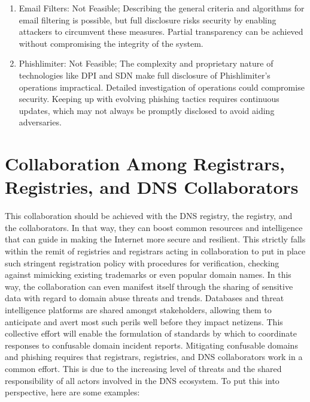 \begin{enumerate}
    \item Email Filters: Not Feasible;  Describing the general criteria and algorithms for email filtering is possible, but full disclosure risks security by enabling attackers to circumvent these measures. Partial transparency can be achieved without compromising the integrity of the system.
    
   
    \item Phishlimiter: Not Feasible; The complexity and proprietary nature of technologies like DPI and SDN make full disclosure of Phishlimiter's operations impractical. Detailed investigation of operations could compromise security. Keeping up with evolving phishing tactics requires continuous updates, which may not always be promptly disclosed to avoid aiding adversaries.
    
\end{enumerate}


\section{Collaboration Among Registrars, Registries, and DNS Collaborators}

This collaboration should be achieved with the DNS registry, the registry, and the collaborators. In that way, they can boost common resources and intelligence that can guide in making the Internet more secure and resilient. This strictly falls within the remit of registries and registrars acting in collaboration to put in place such stringent registration policy with procedures for verification, checking against mimicking existing trademarks or even popular domain names. In this way, the collaboration can even manifest itself through the sharing of sensitive data with regard to domain abuse threats and trends. Databases and threat intelligence platforms are shared amongst stakeholders, allowing them to anticipate and avert most such perils well before they impact netizens. This collective effort will enable the formulation of standards by which to coordinate responses to confusable domain incident reports. Mitigating confusable domains and phishing requires that registrars, registries, and DNS collaborators work in a common effort. This is due to the increasing level of threats and the shared responsibility of all actors involved in the DNS ecosystem. \cite{Catania2022} To put this into perspective, here are some examples: 


